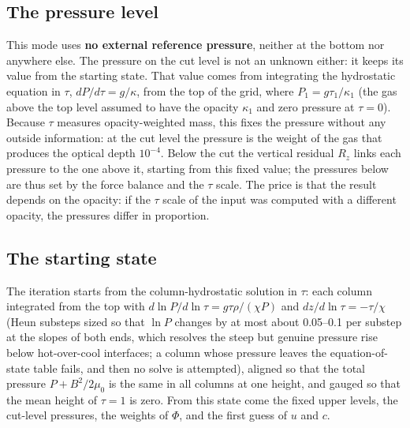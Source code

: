 \subsection{The pressure level}\label{sec:level}
This mode uses \textbf{no external reference pressure}, neither at the bottom nor anywhere else. The pressure on the cut level
is not an unknown either: it keeps its value from the starting state. That value comes from integrating the hydrostatic
equation in $\tau$, $dP/d\tau=g/\kappa$, from the top of the grid, where $P_1=g\tau_1/\kappa_1$ (the gas above the top level
assumed to have the opacity $\kappa_1$ and zero pressure at $\tau=0$). Because $\tau$ measures opacity-weighted mass, this fixes
the pressure without any outside information: at the cut level the pressure is the weight of the gas that produces the optical
depth $10^{-4}$. Below the cut the vertical residual $R_z$ links each pressure to the one above it, starting from this fixed
value; the pressures below are thus set by the force balance and the $\tau$ scale. The price is that the result depends on the
opacity: if the $\tau$ scale of the input was computed with a different opacity, the pressures differ in proportion.

\subsection{The starting state}
The iteration starts from the column-hydrostatic solution in $\tau$: each column integrated from the top with
$d\ln P/d\ln\tau=g\tau\rho/(\chi P)$ and $dz/d\ln\tau=-\tau/\chi$ (Heun substeps sized so that $\ln P$ changes by
at most about 0.05--0.1 per substep at the slopes of both ends, which resolves the steep but genuine pressure rise below
hot-over-cool interfaces; a column whose pressure leaves the equation-of-state table fails, and then no solve is
attempted), aligned so that the total pressure
$P+B^2/2\mu_0$ is the same in all columns at one height, and gauged so that the mean height of $\tau=1$ is zero. From this
state come the fixed upper levels, the cut-level pressures, the weights of $\Phi$, and the first guess of $u$ and $c$.

